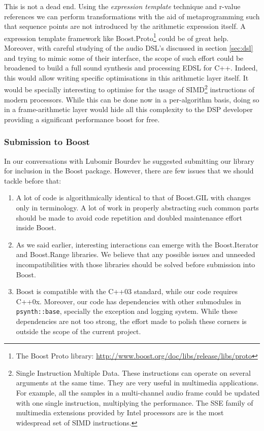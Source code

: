 This is not a dead end. Using the 
\emph{expression template} \cite{veldhuizen95expression} technique and
r-value references we can perform transformations with the aid of
metaprogramming such that sequence points are not introduced by the
arithmetic expression itself. A expression template framework like
Boost.Proto\footnote{The Boost Proto library:
  \url{http://www.boost.org/doc/libs/release/libs/proto}}
\cite{niebler07proto} could be of great help. Moreover, with careful
studying of the audio DSL's discussed in section \ref{sec:dsl} and
trying to mimic some of their interface, the scope of such effort
could be broadened to build a full sound synthesis and processing EDSL
for C++. Indeed, this would allow writing specific optimisations in
this arithmetic layer itself. It would be specially interesting to
optimise for the usage of SIMD\footnote{Single Instruction Multiple
  Data. These instructions can operate on several arguments at the
  same time. They are very useful in multimedia applications. For
  example, all the samples in a multi-channel audio frame could be
  updated with one single instruction, multiplying the
  performance. The SSE family of multimedia extensions provided by
  Intel processors are is the most widespread set of SIMD
  instructions.} instructions of modern processors. While this can be
done now in a per-algorithm basis, doing so in a frame-arithmetic
layer would hide all this complexity to the DSP developer providing a
significant performance boost for free. 

\subsubsection{Submission to Boost}

In our conversations with Lubomir Bourdev he
suggested submitting our library for inclusion in the Boost
package. However, there are few issues that we should tackle before
that:

\begin{enumerate}
\item A lot of code is algorithmically identical to that of Boost.GIL
  with changes only in terminology. A lot of work in properly
  abstracting such common parts should be made to avoid code
  repetition and doubled maintenance effort inside Boost.

\item As we said earlier, interesting interactions can emerge with
  the Boost.Iterator and Boost.Range libraries. We believe that any
  possible issues and unneeded incompatibilities with those libraries
  should be solved before submission into Boost.

\item Boost is compatible with the C++03 standard, while our code
  requires C++0x. Moreover, our code has dependencies with other
  submodules in \texttt{psynth::base}, specially the exception and
  logging system. While these dependencies are not too strong, the
  effort made to polish these corners is outside the scope of the
  current project.
\end{enumerate}


